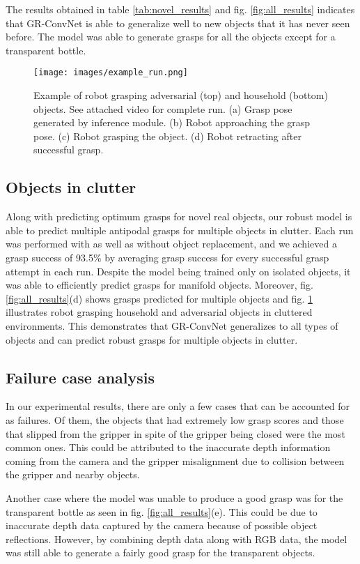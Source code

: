 \documentclass[letterpaper, 10pt, conference]{IEEEtran}
\begin{document}
The results obtained in table \ref{tab:novel_results} and fig. \ref{fig:all_results} indicates that GR-ConvNet is able to generalize well to new objects that it has never seen before. The model was able to generate grasps for all the objects except for a transparent bottle.

\begin{figure}
    \centering
    \texttt{[image: images/example\_run.png]}
    \caption{Example of robot grasping adversarial (top) and household (bottom) objects. See attached video for complete run. (a) Grasp pose generated by inference module. (b) Robot approaching the grasp pose. (c) Robot grasping the object. (d) Robot retracting after successful grasp.}
    \label{fig: example_run}
\end{figure}


\subsection{Objects in clutter}
Along with predicting optimum grasps for novel real objects, our robust model is able to predict multiple antipodal grasps for multiple objects in clutter. Each run was performed with as well as without object replacement, and we achieved a grasp success of 93.5\% by averaging grasp success for every successful grasp attempt in each run. Despite the model being trained only on isolated objects, it was able to efficiently predict grasps for manifold objects. Moreover, fig. \ref{fig:all_results}(d) shows grasps predicted for multiple objects and fig. \ref{fig: example_run} illustrates robot grasping household and adversarial objects in cluttered environments. This demonstrates that GR-ConvNet generalizes to all types of objects and can predict robust grasps for multiple objects in clutter. 

\subsection{Failure case analysis}
In our experimental results, there are only a few cases that can be accounted for as failures. Of them, the objects that had extremely low grasp scores and those that slipped from the gripper in spite of the gripper being closed were the most common ones. This could be attributed to the inaccurate depth information coming from the camera and the gripper misalignment due to collision between the gripper and nearby objects.

Another case where the model was unable to produce a good grasp was for the transparent bottle as seen in fig. \ref{fig:all_results}(e). This could be due to inaccurate depth data captured by the camera because of possible object reflections. However, by combining depth data along with RGB data, the model was still able to generate a fairly good grasp for the transparent objects.
\end{document}
